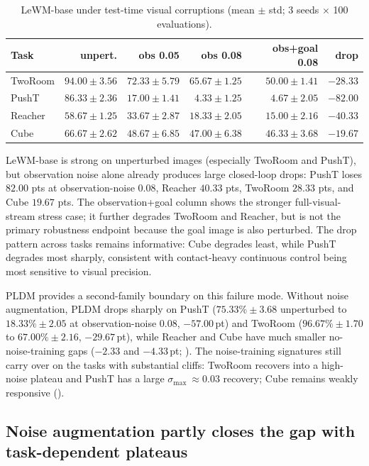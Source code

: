 \documentclass[10pt]{article}
\newcommand{\stdmax}{\ensuremath{\sigma_{\max}}}
\begin{document}
\begin{table}[tbp]
\centering
\caption{LeWM-base under test-time visual corruptions (mean $\pm$ std; 3 seeds $\times$ 100 evaluations).}
\label{tab:corruption-cliff}
\small
\begin{tabular}{lrrrrr}
\toprule
Task & unpert. & obs 0.05 & obs 0.08 & obs+goal 0.08 & drop \\
\midrule
TwoRoom & $94.00 \pm 3.56$ & $72.33 \pm 5.79$ & $65.67 \pm 1.25$ & $50.00 \pm 1.41$ & $-28.33$ \\
PushT   & $86.33 \pm 2.36$ & $17.00 \pm 1.41$ & $\phantom{0}4.33 \pm 1.25$ & $\phantom{0}4.67 \pm 2.05$ & $-82.00$ \\
Reacher & $58.67 \pm 1.25$ & $33.67 \pm 2.87$ & $18.33 \pm 2.05$ & $15.00 \pm 2.16$ & $-40.33$ \\
Cube    & $66.67 \pm 2.62$ & $48.67 \pm 6.85$ & $47.00 \pm 6.38$ & $46.33 \pm 3.68$ & $-19.67$ \\
\bottomrule
\end{tabular}
\end{table}

LeWM-base is strong on unperturbed images (especially TwoRoom and PushT), but observation noise alone already produces large closed-loop drops: PushT loses $82.00$ pts at observation-noise 0.08, Reacher $40.33$ pts, TwoRoom $28.33$ pts, and Cube $19.67$ pts. The observation+goal column shows the stronger full-visual-stream stress case; it further degrades TwoRoom and Reacher, but is not the primary robustness endpoint because the goal image is also perturbed. The drop pattern across tasks remains informative: Cube degrades least, while PushT degrades most sharply, consistent with contact-heavy continuous control being most sensitive to visual precision.

PLDM provides a second-family boundary on this failure mode. Without noise augmentation, PLDM drops sharply on PushT ($75.33\% \pm 3.68$ unperturbed to $18.33\% \pm 2.05$ at observation-noise 0.08, $-57.00$\,pt) and TwoRoom ($96.67\% \pm 1.70$ to $67.00\% \pm 2.16$, $-29.67$\,pt), while Reacher and Cube have much smaller no-noise-training gaps ($-2.33$ and $-4.33$\,pt; ). The noise-training signatures still carry over on the tasks with substantial cliffs: TwoRoom recovers into a high-noise plateau and PushT has a large $\stdmax{}~\approx 0.03$ recovery; Cube remains weakly responsive ().

\subsection{Noise augmentation partly closes the gap with task-dependent plateaus}\label{sec:exp-sweep}
\end{document}
